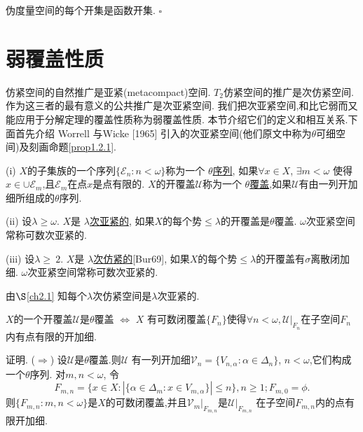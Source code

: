 \documentclass[main.tex]{subfiles}
\begin{document}
\begin{fact}
伪度量空间的每个开集是函数开集. $\square$
\end{fact}

\section{弱覆盖性质}\label{ch1.2}
仿紧空间的自然推广是亚紧(metacompact)空间.
$T_2$仿紧空间的推广是次仿紧空间.
作为这三者的最有意义的公共推广是次亚紧空间.
我们把次亚紧空间,和比它弱而又能应用于分解定理的覆盖性质称为弱覆盖性质.
本节介绍它们的定义和相互关系.下面首先介绍 Worrell 与Wicke [1965] 引入的次亚紧空间(他们原文中称为$\theta$可细空间)及刻画命题\ref{prop1.2.1}.


\begin{definition}
\textnormal{(i)} $X$的子集族的一个序列$\{\mathscr{E}_n:n<\omega\}$称为一个
\underline{$\theta$序列},
如果$\forall x\in X$, $ \exists m < \omega$ 使得$x\in\cup \mathscr{E}_m$,且$\mathscr{E}_m$在点$x$是点有限的.
$X$的开覆盖$\mathscr{U}$称为一个 \underline{$\theta$覆盖},如果$\mathscr{U}$有由一列开加细所组成的$\theta$序列.

\textnormal{(ii)} 设$\lambda\ge\omega$. $X$是 \underline{$\lambda$次亚紧的},
如果$X$的每个势$\le\lambda$的开覆盖是$\theta$覆盖.
$\omega$次亚紧空间常称可数次亚紧的.


\textnormal{(iii)} 设$\lambda\ge\ 2$. $X$是 \underline{$\lambda$次仿紧的}\textnormal{[Bur69]},
如果$X$的每个势$\le\lambda$的开覆盖有$\sigma$离散闭加细.
$\omega$次亚紧空间常称可数次亚紧的.
\end{definition}

由$\S$\ref{ch2.1} 知每个$\lambda$次仿紧空间是$\lambda$次亚紧的.

\begin{proposition}\label{prop1.2.1}
$X$的一个开覆盖$\mathscr{U}$是$\theta$覆盖 $\Leftrightarrow$
$X$ 有可数闭覆盖$\{F_n\}$使得$\forall n < \omega, \mathscr{U}|_{F_n}$在子空间${F_n}$内有点有限的开加细.
\end{proposition}

证明. ($\Rightarrow$) 设$\mathscr{U}$是$\theta$覆盖.则$\mathscr{U}$
有一列开加细$\mathscr{V}_n = \{V_{n, \alpha}: \alpha\in \Delta_n\}$,
$n<\omega$,它们构成一个$\theta$序列.
对$m,n<\omega$, 令
$$F_{m,n}=\{x\in X: |\{\alpha\in\Delta_m: x\in V_{m,\alpha}\}|\le n\}, n\ge 1; F_{m,0} = \phi.$$
则$\{F_{m,n}:m,n<\omega\}$是$X$的可数闭覆盖,并且$\mathscr{V}_m|_{F_{m,n}}$是$\mathscr{U}|_{F_{m,n}}$
在子空间$F_{m,n}$内的点有限开加细.
\end{document}
